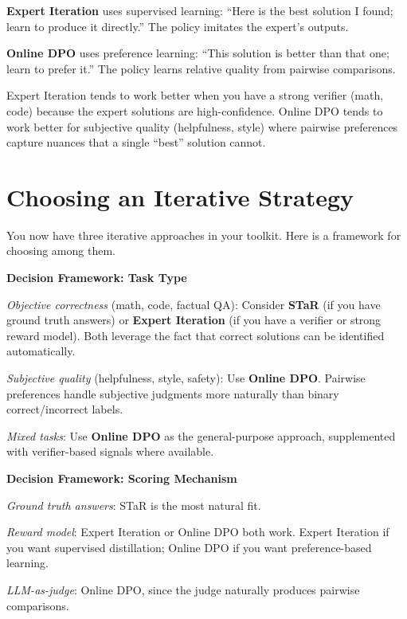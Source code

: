 \begin{chapterenv}
\begin{tipbox}
\textbf{Expert Iteration} uses supervised learning: ``Here is the best solution I found; learn to produce it directly.'' The policy imitates the expert's outputs.

\textbf{Online DPO} uses preference learning: ``This solution is better than that one; learn to prefer it.'' The policy learns relative quality from pairwise comparisons.

Expert Iteration tends to work better when you have a strong verifier (math, code) because the expert solutions are high-confidence. Online DPO tends to work better for subjective quality (helpfulness, style) where pairwise preferences capture nuances that a single ``best'' solution cannot.
\end{tipbox}

\section{Choosing an Iterative Strategy}

You now have three iterative approaches in your toolkit. Here is a framework for choosing among them.

\begin{infobox}
\textbf{Decision Framework: Task Type}

\textit{Objective correctness} (math, code, factual QA): Consider \textbf{STaR} (if you have ground truth answers) or \textbf{Expert Iteration} (if you have a verifier or strong reward model). Both leverage the fact that correct solutions can be identified automatically.

\textit{Subjective quality} (helpfulness, style, safety): Use \textbf{Online DPO}. Pairwise preferences handle subjective judgments more naturally than binary correct/incorrect labels.

\textit{Mixed tasks}: Use \textbf{Online DPO} as the general-purpose approach, supplemented with verifier-based signals where available.
\end{infobox}

\begin{infobox}
\textbf{Decision Framework: Scoring Mechanism}

\textit{Ground truth answers}: STaR is the most natural fit.

\textit{Reward model}: Expert Iteration or Online DPO both work. Expert Iteration if you want supervised distillation; Online DPO if you want preference-based learning.

\textit{LLM-as-judge}: Online DPO, since the judge naturally produces pairwise comparisons.
\end{infobox}


\end{chapterenv}
